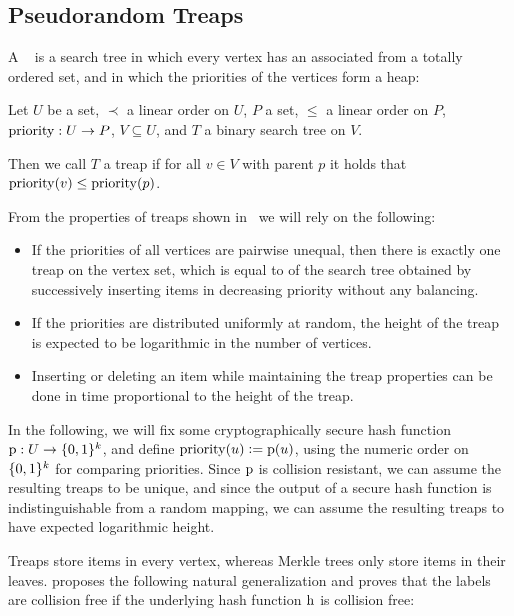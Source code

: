 \subsection{Pseudorandom Treaps}

A ~\cite{seidel1996randomized} is a search tree in which every vertex has an associated  from a totally ordered set, and in which the priorities of the vertices form a heap:

\begin{definition}
Let $U$ be a set, $\prec$ a linear order on $U$, $P$ a set, $\leq$ a linear order on $P$, ${\operatorname{priority}}: {U} \rightarrow {P}$, $V \subseteq U$, and $T$ a binary search tree on $V$.

Then we call $T$ a treap if for all $v \in V$ with parent $p$ it holds that $\operatorname{priority}(v) \leq \operatorname{priority}(p)$.
\end{definition}

From the properties of treaps shown in~\cite{seidel1996randomized} we will rely on the following:

\begin{itemize}
  \item If the priorities of all vertices are pairwise unequal, then there is exactly one treap on the vertex set, which is equal to of the search tree obtained by successively inserting items in decreasing priority without any balancing.
  \item If the priorities are distributed uniformly at random, the height of the treap is expected to be logarithmic in the number of vertices.
  \item Inserting or deleting an item while maintaining the treap properties can be done in time proportional to the height of the treap.
\end{itemize}

In the following, we will fix some cryptographically secure hash function ${\operatorname{p}}: {U} \rightarrow {\{0, 1\}^k}$, and define $\operatorname{priority}(u) \vcentcolon= \operatorname{p}(u)$, using the numeric order on $\{0, 1\}^k$ for comparing priorities. Since $\operatorname{p}$ is collision resistant, we can assume the resulting treaps to be unique, and since the output of a secure hash function is indistinguishable from a random mapping, we can assume the resulting treaps to have expected logarithmic height.

Treaps store items in every vertex, whereas Merkle trees only store items in their leaves. \cite{buldas2002eliminating} proposes the following natural generalization and proves that the labels are collision free if the underlying hash function $\operatorname{h}$ is collision free:

